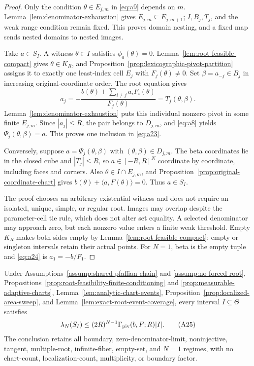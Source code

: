 \begin{proof}
Only the condition $\theta\in E_{j,m}$ in \eqref{eq:a9} depends on $m$.
Lemma~\ref{lem:denominator-exhaustion} gives
$E_{j,m}\subseteq E_{j,m+1}$; $I,B_j,T_j$, and the weak range condition
remain fixed.  This proves domain nesting, and a fixed map sends nested
domains to nested images.

Take $a\in S_I$.  A witness $\theta\in I$ satisfies $\phi_a(\theta)=0$.
Lemma~\ref{lem:root-feasible-compact} gives $\theta\in K_R$, and
Proposition~\ref{prop:lexicographic-pivot-partition} assigns it to exactly
one least-index cell $E_j$ with $F_j(\theta)\neq0$.  Set
$\beta=a_{-j}\in B_j$ in increasing original-coordinate order.  The root
equation gives
\[
a_j=-\frac{b(\theta)+\sum_{i\neq j}a_iF_i(\theta)}{F_j(\theta)}
=T_j(\theta,\beta).
\tag{A24}\label{eq:a24}
\]
Lemma~\ref{lem:denominator-exhaustion} puts this individual nonzero pivot in
some finite $E_{j,m}$.  Since $|a_j|\leq R$, the pair belongs to
$D_{j,m}$, and \eqref{eq:a8} yields $\Psi_j(\theta,\beta)=a$.  This proves
one inclusion in \eqref{eq:a23}.

Conversely, suppose $a=\Psi_j(\theta,\beta)$ with
$(\theta,\beta)\in D_{j,m}$.  The beta coordinates lie in the closed cube
and $|T_j|\leq R$, so $a\in[-R,R]^N$ coordinate by coordinate, including
faces and corners.  Also $\theta\in I\cap E_{j,m}$, and
Proposition~\ref{prop:original-coordinate-chart} gives
$b(\theta)+\langle a,F(\theta)\rangle=0$.  Thus $a\in S_I$.

The proof chooses an arbitrary existential witness and does not require an
isolated, unique, simple, or regular root.  Images may overlap despite the
parameter-cell tie rule, which does not alter set equality.  A selected
denominator may approach zero, but each nonzero value enters a finite weak
threshold.  Empty $K_R$ makes both sides empty by
Lemma~\ref{lem:root-feasible-compact}; empty or singleton intervals retain
their actual points.  For $N=1$, beta is the empty tuple and
\eqref{eq:a24} is $a_1=-b/F_1$.
\end{proof}

\begin{proposition}
\label{prop:root-event-volume}
Under Assumptions~\ref{assump:shared-pfaffian-chain} and
\ref{assump:no-forced-root}, Propositions~\ref{prop:root-feasibility-finite-conditioning}
and \ref{prop:measurable-adaptive-charts},
Lemma~\ref{lem:analytic-chart-events},
Proposition~\ref{prop:localized-area-sweep}, and
Lemma~\ref{lem:exact-root-event-coverage}, every interval
$I\subseteq\Theta$ satisfies
\[
\lambda_N(S_I)
\leq(2R)^{N-1}\Gamma_{\rm piv}(b,F;R)|I|.
\tag{A25}\label{eq:a25}
\]
The conclusion retains all boundary, zero-denominator-limit, noninjective,
tangent, multiple-root, infinite-fiber, empty-set, and $N=1$ regimes, with
no chart-count, localization-count, multiplicity, or boundary factor.
\end{proposition}

